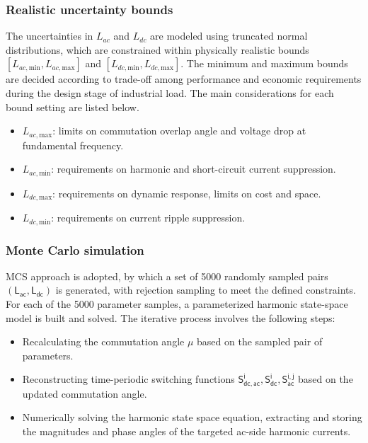 \subsubsection{Realistic uncertainty bounds}
The uncertainties in $L_{ac}$ and $L_{dc}$ are modeled using truncated normal distributions, which are constrained within physically realistic bounds $[L_{ac, \text{min}}, L_{ac, \text{max}}]$ and $[L_{dc, \text{min}}, L_{dc, \text{max}}]$. The minimum and maximum bounds are decided according to trade-off among performance and economic requirements during the design stage of industrial load. The main considerations for each bound setting are listed below.
\begin{itemize}
    \item $L_{ac, \text{max}}$: limits on commutation overlap angle and voltage drop at fundamental frequency.
    \item $L_{ac, \text{min}}$: requirements on harmonic and short-circuit current suppression.
    \item $L_{dc, \text{max}}$: requirements on dynamic response, limits on cost and space.
    \item $L_{dc, \text{min}}$: requirements on current ripple suppression.
\end{itemize}

\subsubsection{Monte Carlo simulation}
MCS approach is adopted, by which a set of 5000 randomly sampled pairs $(\mathsf{L_{ac}}, \mathsf{L_{dc}})$ is generated, with rejection sampling to meet the defined constraints. For each of the 5000 parameter samples, a parameterized harmonic state-space model is built and solved. The iterative process involves the following steps:
\begin{itemize}
    \item Recalculating the commutation angle $\mathsf{\mu}$ based on the sampled pair of parameters.
    \item Reconstructing time-periodic switching functions $\mathsf{S_{dc,ac}^{i}}, \mathsf{S_{dc}^{i}}, \mathsf{S_{ac}^{i,j}}$ based on the updated commutation angle.
    \item Numerically solving the harmonic state space equation, extracting and storing the magnitudes and phase angles of the targeted ac-side harmonic currents.
\end{itemize}

